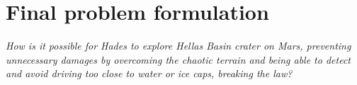 \chapter{Final problem formulation}\label{ch:finalproblem}
\textit{How is it possible for Hades to explore Hellas Basin crater on Mars, preventing unnecessary damages by overcoming the chaotic terrain and being able to detect and avoid driving too close to water or ice caps, breaking the law?}
\newline



